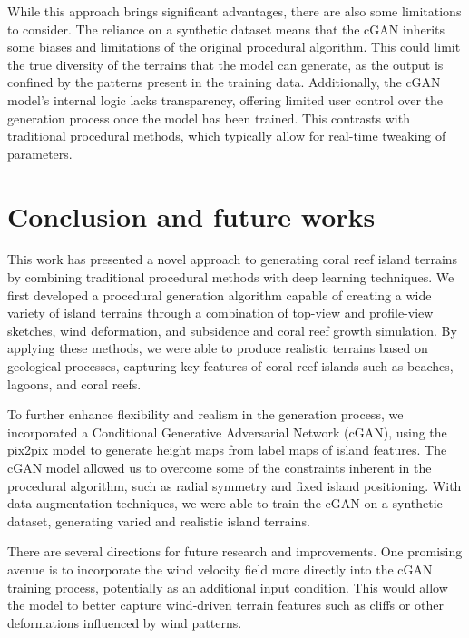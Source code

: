While this approach brings significant advantages, there are also some limitations to consider. The reliance on a synthetic dataset means that the cGAN inherits some biases and limitations of the original procedural algorithm. This could limit the true diversity of the terrains that the model can generate, as the output is confined by the patterns present in the training data. Additionally, the cGAN model's internal logic lacks transparency, offering limited user control over the generation process once the model has been trained. This contrasts with traditional procedural methods, which typically allow for real-time tweaking of parameters.

\section{Conclusion and future works}
\label{sec:coral-island-conclusion}

This work has presented a novel approach to generating coral reef island terrains by combining traditional procedural methods with deep learning techniques. We first developed a procedural generation algorithm capable of creating a wide variety of island terrains through a combination of top-view and profile-view sketches, wind deformation, and subsidence and coral reef growth simulation. By applying these methods, we were able to produce realistic terrains based on geological processes, capturing key features of coral reef islands such as beaches, lagoons, and coral reefs.

To further enhance flexibility and realism in the generation process, we incorporated a Conditional Generative Adversarial Network (cGAN), using the pix2pix model to generate height maps from label maps of island features. The cGAN model allowed us to overcome some of the constraints inherent in the procedural algorithm, such as radial symmetry and fixed island positioning. With data augmentation techniques, we were able to train the cGAN on a synthetic dataset, generating varied and realistic island terrains.


There are several directions for future research and improvements. One promising avenue is to incorporate the wind velocity field more directly into the cGAN training process, potentially as an additional input condition. This would allow the model to better capture wind-driven terrain features such as cliffs or other deformations influenced by wind patterns.

